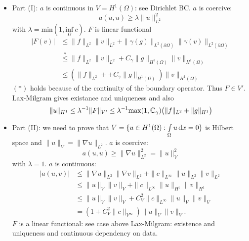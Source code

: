 \begin{enumerate}[=(\alph*)]
\begin{proof_}
		\begin{itemize}
			\item Part (I): \enter
				$a$ is continuous in $V = H^1(\Omega)$: see Dirichlet BC.\enter
				$a$ is coercive:
				\begin{equation*}
					a(u,u) \geq \lambda \|u\|^2_{L^2}
				\end{equation*}
				with $\lambda = \text{min}(1, \underset{\Omega}{\text{inf}}\ c )$.\enter
				$F$ is linear functional
				\begin{align*}
					|F(v)| & \leq \|f\|_{L^2} \|v\|_{L^2} + \|\gamma(g)\|_{L^2(\partial \Omega) } \|\gamma(v)\|_{L^2(\partial \Omega) }\\
					& \overset{*}{\leq} \|f\|_{L^2} \|v\|_{L^2} +C_\gamma \|g\|_{H^1(\Omega)}\|v\|_{H^1(\Omega)}\\
					& \leq \left( \|f\|_{L^2} + +C_\gamma \|g\|_{H^1(\Omega)} \right)\|v\|_{H^1(\Omega)}
				\end{align*}
				$(*)$ holds because of the continuity of the boundary operator. Thus $F \in V'$.\enter
				Lax-Milgram gives existance and uniqueness and also 
				\begin{equation*}
					 \|u\|_{H^1} \leq \lambda^{-1} \|F\|_{V'} \leq \lambda^{-1} \text{max}(1, \mathbb{C}_\gamma)\big (  \|f\|_{L^2} + \|g\|_{H^1} \big )
				\end{equation*}
			\item Part (II): \enter
				we need to prove that $ V = \{ u \in H^1(\Omega): \int \limits_\Omega u \mathop{}\!\mathrm{d} x =0 \}$ is Hilbert space and $\|u\|_V = \|\nabla u \|_{L^2}$.\enter
				$a$ is coercive:
				\begin{equation*}
					a(u,u) \geq \|\nabla u\|^2_{L^2} = \|u\|^2_V
				\end{equation*}
				with $\lambda = 1$.\enter
				$a$ is continuous:
				\begin{align*}
					|a(u,v)| &\leq \|\nabla u\|_{L^2}\|\nabla v\|_{L^2} + \|c\|_{L^\infty} \| u\|_{L^2} \|v\|_{L^2}\\
					& \leq \| u\|_{V}\| v\|_{V} + \|c\|_{L^\infty} \| u\|_{H^1} \|v\|_{H^1}\\
					& \leq \| u\|_{V}\| v\|_{V} + C^2_V\|c\|_{L^\infty} \| u\|_{V} \|v\|_{V}\\
					&= \left( 1 + C^2_V \|c\|_{V^\infty} \right) \|u\|_V \|v\|_V.
				\end{align*}
				$F$ is a linear functional: see case above\enter
				Lax-Milgram: existence and uniqueness and continuous dependency on data.
		\end{itemize}

\end{proof_}
\end{enumerate}
